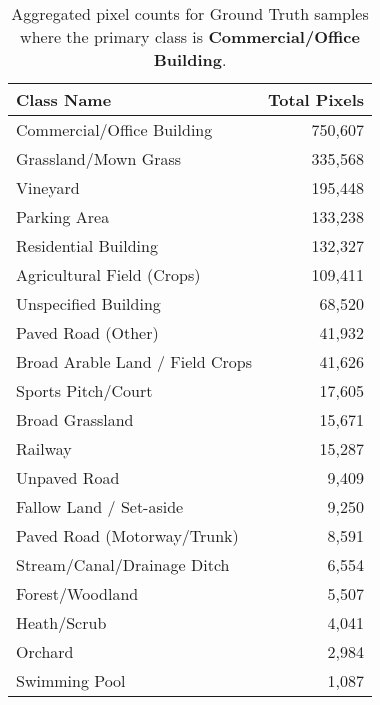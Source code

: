 
\begin{table}[H] %
    \centering
    \caption{Aggregated pixel counts for Ground Truth samples where the primary class is \textbf{Commercial/Office Building}.}
    \label{tab:gt_counts_2}
    \begin{tabular}{lr}
        \hline
        \textbf{Class Name} & \textbf{Total Pixels} \\
        \hline
        Commercial/Office Building & 750,607 \\
        Grassland/Mown Grass & 335,568 \\
        Vineyard & 195,448 \\
        Parking Area & 133,238 \\
        Residential Building & 132,327 \\
        Agricultural Field (Crops) & 109,411 \\
        Unspecified Building & 68,520 \\
        Paved Road (Other) & 41,932 \\
        Broad Arable Land / Field Crops & 41,626 \\
        Sports Pitch/Court & 17,605 \\
        Broad Grassland & 15,671 \\
        Railway & 15,287 \\
        Unpaved Road & 9,409 \\
        Fallow Land / Set-aside & 9,250 \\
        Paved Road (Motorway/Trunk) & 8,591 \\
        Stream/Canal/Drainage Ditch & 6,554 \\
        Forest/Woodland & 5,507 \\
        Heath/Scrub & 4,041 \\
        Orchard & 2,984 \\
        Swimming Pool & 1,087 \\
        \hline
    \end{tabular}
\end{table}

